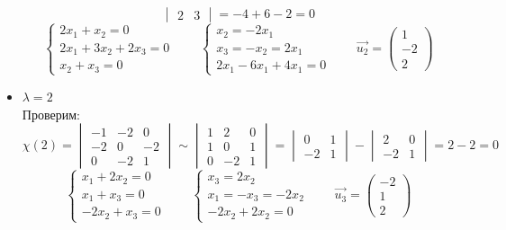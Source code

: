 \begin{itemize}
$$\begin{vmatrix}
        2 & 3
    \end{vmatrix} = -4 + 6 - 2 = 0 $$
    $$
    \begin{cases}
    	2x_1 + x_2 = 0 \\
        2x_1 + 3x_2 + 2x_3 = 0 \\
        x_2 + x_3 = 0
    \end{cases} \qquad
    \begin{cases}
    	x_2 = -2x_1 \\
        x_3 = -x_2 = 2x_1 \\
        2x_1 - 6x_1 + 4x_1 = 0
    \end{cases} \qquad \vec{u_2} =
    \begin{pmatrix}
    	1 \\
        -2 \\
        2
    \end{pmatrix} $$
    \item $ \lambda = 2 $ \\
    Проверим:
    $$ \chi(2) =
    \begin{vmatrix}
    	-1 & -2 & 0 \\
        -2 & 0 & -2 \\
        0 & -2 & 1
    \end{vmatrix} \sim
    \begin{vmatrix}
    	1 & 2 & 0 \\
        1 & 0 & 1 \\
        0 & -2 & 1
    \end{vmatrix} =
    \begin{vmatrix}
    	0 & 1 \\
        -2 & 1
    \end{vmatrix} -
    \begin{vmatrix}
    	2 & 0 \\
        -2 & 1
    \end{vmatrix} = 2 - 2 = 0 $$
    $$
    \begin{cases}
    	x_1 + 2x_2 = 0 \\
        x_1 + x_3 = 0 \\
        -2x_2 + x_3 = 0
    \end{cases} \qquad
    \begin{cases}
    	x_3 = 2x_2 \\
        x_1 = -x_3 = -2x_2 \\
        -2x_2 + 2x_2 = 0
    \end{cases} \qquad \vec{u_3} =
    \begin{pmatrix}
    	-2 \\
        1 \\
        2
    \end{pmatrix} $$
\end{itemize}
